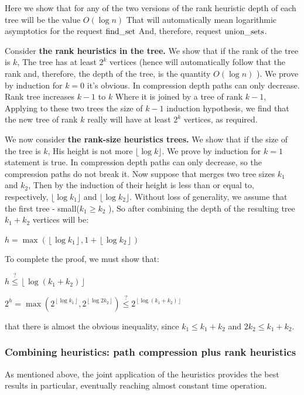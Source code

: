 Here we show that for any of the two versions of the rank heuristic depth of each tree will be the value $O (\log n)$ That will automatically mean logarithmic asymptotics for the request $\rm find \_set$ And, therefore, request $\rm union \_sets$.

Consider \textbf{the rank heuristics in the tree.} We show that if the rank of the tree is $k$, The tree has at least $2 ^ k$ vertices (hence will automatically follow that the rank and, therefore, the depth of the tree, is the quantity $O (\log n)$ ). We prove by induction for $k = 0$ it's obvious. In compression depth paths can only decrease. Rank tree increases $k-1$ to $k$ Where it is joined by a tree of rank $k-1$, Applying to these two trees the size of $k-1$ induction hypothesis, we find that the new tree of rank $k$ really will have at least $2 ^ k$ vertices, as required.

We now consider \textbf{the rank-size heuristics trees.} We show that if the size of the tree is $k$, His height is not more $\lfloor \log k \rfloor$. We prove by induction for $k = 1$ statement is true. In compression depth paths can only decrease, so the compression paths do not break it. Now suppose that merges two tree sizes $k_1$ and $k_2$, Then by the induction of their height is less than or equal to, respectively, $\lfloor \log k_1 \rfloor$ and $\lfloor \log k_2 \rfloor$. Without loss of generality, we assume that the first tree - small($k_1 \ge k_2$ ), So after combining the depth of the resulting tree $k_1 + k_2$ vertices will be:

$h=\max\left(\left\lfloor \log k_{1}\right\rfloor,1+\left\lfloor \log k_{2}\right\rfloor \right)$

To complete the proof, we must show that:

$h\overset{?}{\leq}\left\lfloor \log(k_{1}+k_{2})\right\rfloor $

$2^{h}=\max(2^{\left\lfloor \log k_{1}\right\rfloor },2^{\left\lfloor \log2k_{2}\right\rfloor })\overset{?}{\leq}2^{\left\lfloor \log(k_{1}+k_{2})\right\rfloor }$

that there is almost the obvious inequality, since $k_1 \le k_1 + k_2$ and $2 k_2 \le k_1 + k_2$.

\subsubsection{ Combining heuristics: path compression plus rank heuristics }

As mentioned above, the joint application of the heuristics provides the best results in particular, eventually reaching almost constant time operation.

